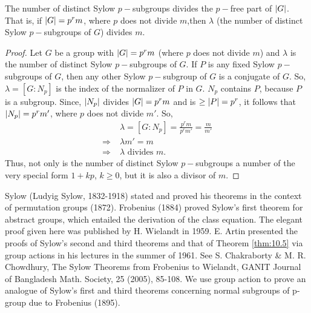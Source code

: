 \documentclass[../main-sheet.tex]{subfiles}
\begin{document}
    \begin{cor}
        The number of distinct Sylow \(p-\)subgroups divides the \(p-\)free part of
        \(\left\vert G\right\vert\). That is, if \(\left\vert G\right\vert= p^rm\), where \(p\) does not divide \(m\),then \(\lambda\) (the number of distinct
        Sylow \(p-\)subgroups of \(G\)) divides \(m\).
    \end{cor}
    \begin{proof}
        Let \(G\) be a group with \(\left\vert G\right\vert = p^rm\) (where \(p\) does not divide \(m\)) and \(\lambda\) is the
        number of distinct Sylow \(p-\)subgroups of \(G \).
        If \(P\) is any fixed Sylow \(p-\)subgroups of \(G\), then any other Sylow \(p-\)subgroup of \(G\) is a
        conjugate of \(G\).
        So, \(\lambda=[G: N_p ]\) is the index of the normalizer of \(P\) in \(G \).
        \(N_p\) contains \(P\), because \(P\) is a subgroup.
        Since, \(\left\vert N_p\right\vert\) divides \(\left\vert G\right\vert = p^rm\) and is \(\geq \left\vert P\right\vert = p^r\),
        it follows that \(\left\vert N_p\right\vert= p^rm'\), where \(p\) does not divide \(m'\).
        So,
        \begin{align*}
            &\lambda = [G: N_p] =\frac{p^r m}{p^r m'}=\frac{m}{m'}\\
            \Rightarrow\;& \lambda m' = m\\
            \Rightarrow\;& \lambda \text{ divides } m.
        \end{align*}
        Thus, not only is the number of distinct Sylow \(p-\)subgroups a number of the very
        special form \(1 + kp\), \(k\geq 0\), but it is also a divisor of \(m\).
    \end{proof}
    \begin{note}
        Sylow (Ludyig Sylow, 1832-1918) stated and proved his theorems in
     the context of permutation groups (1872). Frobenius (1884) proved Sylow's first
        theorem for abstract groups, which entailed the derivation of the class equation. The
        elegant proof given here was published by H. Wielandt in 1959. E. Artin presented the
        proofs of Sylow's second and third theorems and that of Theorem \ref{thm:10.5} via group
        actions in his lectures in the summer of 1961. See S. Chakraborty \& M. R. Chowdhury,
        The Sylow Theorems from Frobenius to Wielandt, GANIT Journal of Bangladesh Math.
        Society, 25 (2005), 85-108.
        We use group action to prove an analogue of Sylow's first and third theorems
        concerning normal subgroups of p-group due to Frobenius (1895).
    \end{note}
\end{document}
